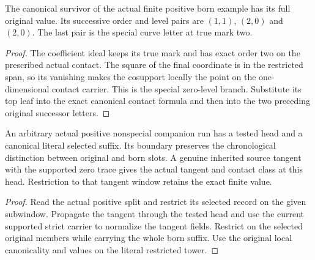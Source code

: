 \begin{theorem}
\label{hir:g1-recursive-born-numerical-payload}
\leanok
The canonical survivor of the actual finite positive born example
has its full original value. Its successive order and level pairs
are $(1,1)$, $(2,0)$ and $(2,0)$. The last pair is the special
curve letter at true mark two.
\end{theorem}
\begin{proof}
The coefficient ideal keeps its true mark and has exact order
two on the prescribed actual contact. The square of the final
coordinate is in the restricted span, so its vanishing makes
the cosupport locally the point on the one-dimensional contact
carrier. This is the special zero-level branch. Substitute its
top leaf into the exact canonical contact formula and then into
the two preceding original successor letters.
\end{proof}

\begin{theorem}
\label{hir:g1-chronological-companion-suffix}
\leanok
An arbitrary actual positive nonspecial companion run
has a tested head and a canonical literal selected suffix.
Its boundary preserves the chronological distinction between
original and born slots. A genuine inherited source tangent
with the supported zero trace gives the actual tangent and
contact class at this head. Restriction to that tangent
window retains the exact finite value.
\end{theorem}
\begin{proof}
Read the actual positive split and restrict its selected
record on the given subwindow. Propagate the tangent through
the tested head and use the current supported strict carrier
to normalize the tangent fields. Restrict on the selected
original members while carrying the whole born suffix.
Use the original local canonicality and values on the
literal restricted tower.
\end{proof}

